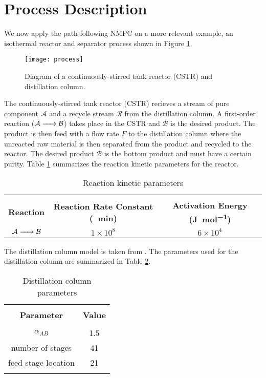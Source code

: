 \section{Process Description}
We now apply the path-following NMPC on a more relevant example, an isothermal reactor and separator process shown in Figure \ref{fig:process}.
	\begin{figure}[H]
		\centering
		\texttt{[image: process]}
		\caption{Diagram of a continuously-stirred tank reactor (CSTR) and distillation column.}
		\label{fig:process}
	\end{figure}
The continuously-stirred tank reactor (CSTR) recieves a stream of pure component $\mathcal{A}$ and a recycle stream $\mathcal{R}$ from the distillation column.
A first-order reaction ($\ce{\mathcal{A} -> \mathcal{B}}$) takes place in the CSTR and $\mathcal{B}$ is the desired product. 
The product is then feed with a flow rate $F$ to the distillation column where the unreacted raw material is then separated from the product and recycled to the reactor.
The desired product $\mathcal{B}$ is the bottom product and must have a certain purity.
Table \ref{tab:rxn_kin} summarizes the reaction kinetic parameters for the reactor.
\begin{table}[H]
	\centering
	\caption{Reaction kinetic parameters}
	\begin{tabular}{c c c}
		\toprule[0.3mm]\\
		\textbf{Reaction} & \textbf{Reaction Rate Constant (\si{\per\minute})} & \textbf{Activation Energy (\si{\joule\per\mole})}\\
		\midrule[0.2mm]
		$\ce{\mathcal{A} -> \mathcal{B}}$ & $1\times10^8$ & $6\times10^4$\\
		\bottomrule[0.3mm]
	\end{tabular}
	\label{tab:rxn_kin}
\end{table}
\par
The distillation column model is taken from \cite{model}.
The parameters used for the distillation column are summarized in Table \ref{tab:column}.
\begin{table}[H]
	\centering
	\caption{Distillation column parameters}
	\begin{tabular}{c c}
		\toprule[0.3mm]\\
		\textbf{Parameter} & \textbf{Value}\\
		\midrule[0.2mm]\\
		$\alpha_{AB}$ & 1.5\\
		number of stages & 41\\
		feed stage location & 21\\
		\bottomrule[0.3mm]\\
	\end{tabular}
	\label{tab:column}
\end{table}
